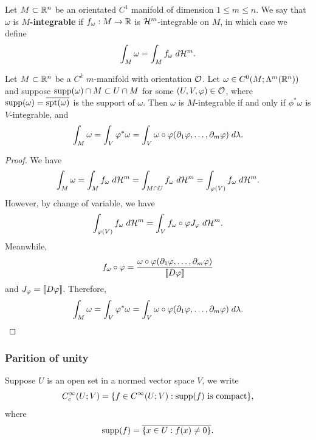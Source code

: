 \documentclass[a4paper]{article}
\begin{document}
\begin{defi}
Let $M \subset \mathbb{R}^n$ be an orientated $C^1$ manifold
of dimension $1 \leq m \leq n$. We say that $\omega$
is \textbf{$M$-integrable} if $f_\omega : M \to \mathbb{R}$ is 
$\mathcal{H}^m$-integrable on $M$, in which case we define 
\[
\int_M \omega = \int_M f_\omega \; d \mathcal{H}^m.
\]
\end{defi}

\begin{prop}
Let $M \subset \mathbb{R}^n$ be a $C^k$ $m$-manifold with orientation 
$\mathcal{O}$. Let $\omega \in C^0(M ; \Lambda^m(\mathbb{R}^n))$ and 
suppose $\operatorname{supp}(\omega) \cap M \subset U \cap M$
for some $(U, V, \varphi) \in \mathcal{O}$, where 
$\operatorname{supp}(\omega) = \overline{\operatorname{spt}(\omega)}$ is the support of 
$\omega$. Then $\omega$ is 
$M$-integrable if and only if $\phi^* \omega$ is $V$-integrable,
and 
\[
\int_M \omega = \int_V \varphi^* \omega = 
\int_V \omega \circ \varphi (\partial_1 \varphi, \dots, \partial_m \varphi) 
\; d \lambda.
\]
\end{prop}

\begin{proof}
We have 
\[
\begin{aligned}
\int_M \omega = \int_M f_\omega \; d \mathcal{H}^m 
= \int_{M \cap U} f_\omega \; d \mathcal{H}^m 
= \int_{\varphi(V)} f_\omega \; d \mathcal{H}^m.
\end{aligned}
\]
However, by change of variable, we have
\[
\int_{\varphi(V)} f_\omega \; d \mathcal{H}^m 
= \int_V f_\omega \circ \varphi J_\varphi \; d \mathcal{H}^m.
\]
Meanwhile, 
\[
f_\omega \circ \varphi = 
\frac{\omega \circ \varphi (\partial_1 \varphi, \dots, \partial_m \varphi)}
{\left\llbracket D \varphi \right\rrbracket}
\]
and $J_\varphi = \left\llbracket D \varphi \right\rrbracket$. 
Therefore, 
\[
\int_M \omega = \int_V \varphi^* \omega = 
\int_V \omega \circ \varphi (\partial_1 \varphi, \dots, \partial_m \varphi) 
\; d \lambda.
\]
\end{proof}

\subsubsection{Parition of unity}

\begin{defi}
Suppose $U$ is an open set in a normed vector 
space $V$, we write 
\[
C_c^\infty (U; V) = \{f \in C^\infty (U; V): 
\text{$\operatorname{supp}(f)$ is compact}\},
\]
where 
\[
\operatorname{supp}(f) = \overline{\{x \in U : f(x) \neq 0\}}.
\]
\end{defi}
\end{document}
